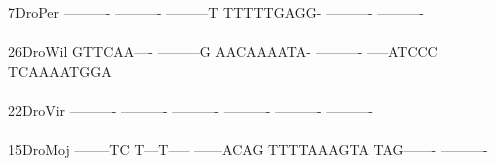 \documentclass[11pt,twoside,reqno,a4paper]{article}
\begin{document}
{7\hspace*{4\charwidth}DroPer	----------	----------	---------T	TTTTTGAGG-	----------	----------	\\
\hspace*{5\charwidth}\hspace*{7\charwidth}\hspace*{1\charwidth}\hspace*{1\charwidth}\hspace*{1\charwidth}\hspace*{1\charwidth}\hspace*{1\charwidth}\hspace*{1\charwidth}\\
26\hspace*{3\charwidth}DroWil	GTTCAA----	---------G	AACAAAATA-	----------	-----ATCCC	TCAAAATGGA	\\
\hspace*{5\charwidth}\hspace*{7\charwidth}\hspace*{1\charwidth}\hspace*{1\charwidth}\hspace*{1\charwidth}\hspace*{1\charwidth}\hspace*{1\charwidth}\hspace*{1\charwidth}\\
22\hspace*{3\charwidth}DroVir	----------	----------	----------	----------	----------	----------	\\
\hspace*{5\charwidth}\hspace*{7\charwidth}\hspace*{1\charwidth}\hspace*{1\charwidth}\hspace*{1\charwidth}\hspace*{1\charwidth}\hspace*{1\charwidth}\hspace*{1\charwidth}\\
15\hspace*{3\charwidth}DroMoj	--------TC	T---T-----	------ACAG	TTTTAAAGTA	TAG-------	----------	\\
\hspace*{5\charwidth}\hspace*{7\charwidth}\hspace*{1\charwidth}\hspace*{1\charwidth}\hspace*{1\charwidth}\hspace*{1\charwidth}\hspace*{1\charwidth}\hspace*{1\charwidth}\\
}
\end{document}
